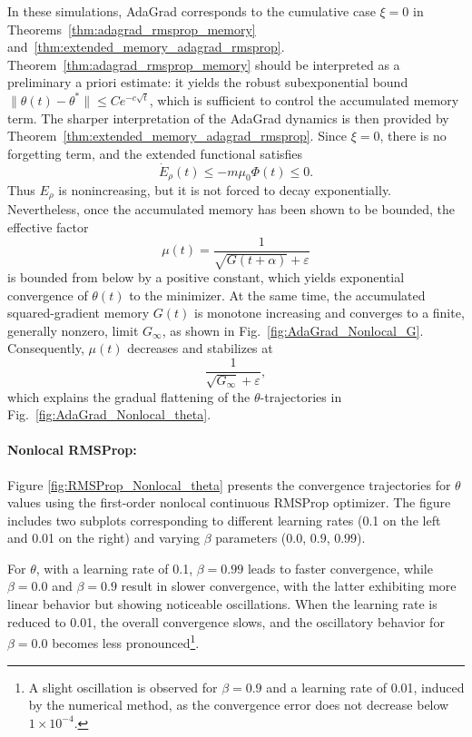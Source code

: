 \documentclass{article} %
\begin{document}
In these simulations, AdaGrad corresponds to the cumulative case $\xi=0$ in Theorems~\ref{thm:adagrad_rmsprop_memory} and~\ref{thm:extended_memory_adagrad_rmsprop}. Theorem~\ref{thm:adagrad_rmsprop_memory} should be interpreted as a preliminary a priori estimate: it yields the robust subexponential bound $\|\theta(t)-\theta^*\|\leq C e^{-c\sqrt{t}}$, which is sufficient to control the accumulated memory term. The sharper interpretation of the AdaGrad 
dynamics is then provided by Theorem~\ref{thm:extended_memory_adagrad_rmsprop}. Since $\xi=0$, there is no forgetting term, and the extended functional satisfies
\[
    \dot E_\rho(t)\leq -m\mu_0\Phi(t)\leq 0.
\]
Thus $E_\rho$ is nonincreasing, but it is not forced to decay exponentially. Nevertheless, once the accumulated memory has been shown to be bounded, the effective factor
\[
    \mu(t)=\frac{1}{\sqrt{G(t+\alpha)}+\varepsilon}
\]
is bounded from below by a positive constant, which yields exponential convergence of $\theta(t)$ to the minimizer. At the same time, the accumulated squared-gradient memory $G(t)$ is monotone increasing and converges to a finite, 
generally nonzero, limit $G_\infty$, as shown in Fig.~\ref{fig:AdaGrad_Nonlocal_G}. Consequently, $\mu(t)$ decreases and stabilizes at
\[
    \frac{1}{\sqrt{G_\infty}+\varepsilon},
\]
which explains the gradual flattening of the $\theta$-trajectories in Fig.~\ref{fig:AdaGrad_Nonlocal_theta}.

\paragraph{Nonlocal RMSProp:} Figure \ref{fig:RMSProp_Nonlocal_theta} presents the convergence trajectories for \(\theta\) values using the first-order nonlocal continuous RMSProp optimizer. The figure includes two subplots corresponding to different learning rates (0.1 on the left and 0.01 on the right) and varying \(\beta\) parameters (\(0.0\), \(0.9\), \(0.99\)).

For \(\theta\), with a learning rate of 0.1, \(\beta = 0.99\) leads to faster convergence, while \(\beta = 0.0\) and \(\beta = 0.9\) result in slower convergence, with the latter exhibiting more linear behavior but showing noticeable oscillations. When the learning rate is reduced to 0.01, the overall convergence slows, and the oscillatory behavior for \(\beta = 0.0\) becomes less pronounced\footnote{A slight oscillation is observed for \(\beta = 0.9\) and a learning rate of 0.01, induced by the numerical method, as the convergence error does not decrease below \(1 \times 10^{-4}\).}.
\end{document}
